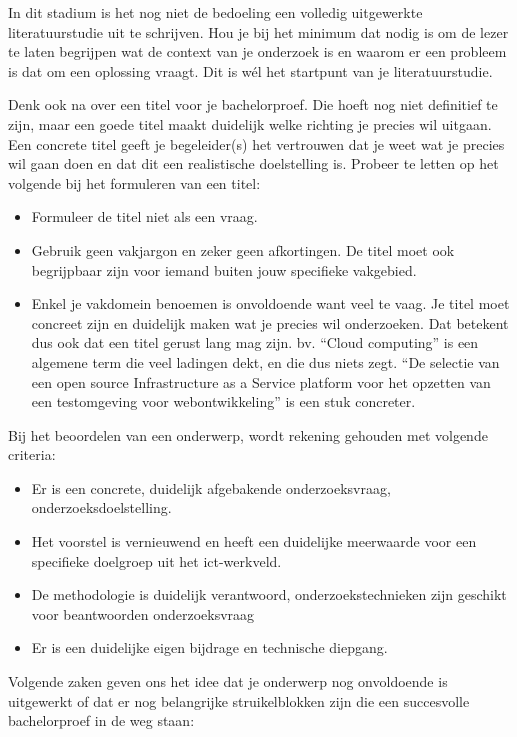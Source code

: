 In dit stadium is het nog niet de bedoeling een volledig uitgewerkte literatuurstudie uit te schrijven. Hou je bij het minimum dat nodig is om de lezer te laten begrijpen wat de context van je onderzoek is en waarom er een probleem is dat om een oplossing vraagt. Dit is wél het startpunt van je literatuurstudie.

Denk ook na over een titel voor je bachelorproef. Die hoeft nog niet definitief te zijn, maar een goede titel maakt duidelijk welke richting je precies wil uitgaan. Een concrete titel geeft je begeleider(s) het vertrouwen dat je weet wat je precies wil gaan doen en dat dit een realistische doelstelling is. Probeer te letten op het volgende bij het formuleren van een titel:

\begin{itemize}
  \item Formuleer de titel niet als een vraag.
  \item Gebruik geen vakjargon en zeker geen afkortingen. De titel moet ook begrijpbaar zijn voor iemand buiten jouw specifieke vakgebied.
  \item Enkel je vakdomein benoemen is onvoldoende want veel te vaag. Je titel moet concreet zijn en duidelijk maken wat je precies wil onderzoeken. Dat betekent dus ook dat een titel gerust lang mag zijn. bv. ``Cloud computing'' is een algemene term die veel ladingen dekt, en die dus niets zegt. ``De selectie van een open source Infrastructure as a Service platform voor het opzetten van een testomgeving voor webontwikkeling'' is een stuk concreter.
\end{itemize}

Bij het beoordelen van een onderwerp, wordt rekening gehouden met volgende criteria:

\begin{itemize}
  \item Er is een concrete, duidelijk afgebakende onderzoeksvraag, onderzoeksdoelstelling.
  \item Het voorstel is vernieuwend en heeft een duidelijke meerwaarde voor een specifieke doelgroep uit het ict-werkveld.
  \item De methodologie is duidelijk verantwoord, onderzoekstechnieken zijn geschikt voor beantwoorden onderzoeksvraag
  \item Er is een duidelijke eigen bijdrage en technische diepgang.
\end{itemize}

Volgende zaken geven ons het idee dat je onderwerp nog onvoldoende is uitgewerkt of dat er nog belangrijke struikelblokken zijn die een succesvolle bachelorproef in de weg staan:

